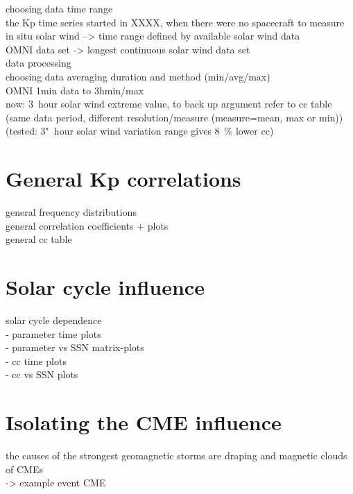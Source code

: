 choosing data time range\\
the Kp time series started in XXXX, when there were no spacecraft to measure in situ solar wind --> time range defined by available solar wind data\\
OMNI data set -> longest continuous solar wind data set\\


data processing\\
choosing data averaging duration and method (min/avg/max)\\
OMNI 1min data to 3hmin/max\\
now: 3~hour solar wind extreme value, to back up argument refer to cc table (same data period, different resolution/measure (measure=mean, max or min))\\
		(tested: 3"~hour solar wind variation range gives 8~\% lower cc)\\


\section{General Kp correlations}

general frequency distributions\\

general correlation coefficients + plots\\

general cc table\\

\section{Solar cycle influence}

solar cycle dependence\\
- parameter time plots\\
- parameter vs SSN matrix-plots\\
- cc time plots\\
- cc vs SSN plots\\

\section{Isolating the CME influence}

the causes of the strongest geomagnetic storms are draping and magnetic clouds of CMEs \citep{Bothmer1993}\\

-> example event CME\\


